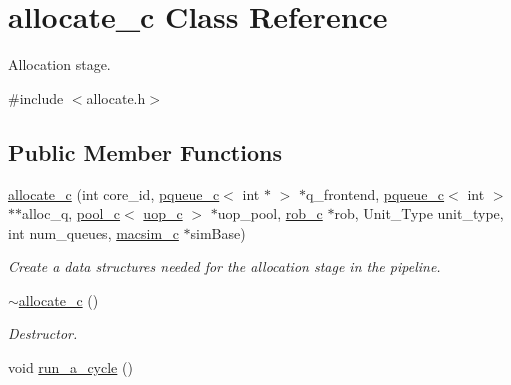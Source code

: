 \hypertarget{classallocate__c}{
\section{allocate\_\-c Class Reference}
\label{classallocate__c}
}


Allocation stage.  




{\ttfamily \#include $<$allocate.h$>$}

\subsection*{Public Member Functions}
\begin{DoxyCompactItemize}
\item 
\hyperlink{classallocate__c_aad0429c55ad2e9189f140647394896fb}{allocate\_\-c} (int core\_\-id, \hyperlink{classpqueue__c}{pqueue\_\-c}$<$ int $\ast$ $>$ $\ast$q\_\-frontend, \hyperlink{classpqueue__c}{pqueue\_\-c}$<$ int $>$ $\ast$$\ast$alloc\_\-q, \hyperlink{classpool__c}{pool\_\-c}$<$ \hyperlink{classuop__c}{uop\_\-c} $>$ $\ast$uop\_\-pool, \hyperlink{classrob__c}{rob\_\-c} $\ast$rob, Unit\_\-Type unit\_\-type, int num\_\-queues, \hyperlink{classmacsim__c}{macsim\_\-c} $\ast$simBase)
\begin{DoxyCompactList}\small\item\em Create a data structures needed for the allocation stage in the pipeline. \item\end{DoxyCompactList}\item 
\hyperlink{classallocate__c_a4c9c36de958b00180d586f7be7fdfed7}{$\sim$allocate\_\-c} ()
\begin{DoxyCompactList}\small\item\em Destructor. \item\end{DoxyCompactList}\item 
\hypertarget{classallocate__c_abd04c52f9cd71a29223d0131ad630332}{
void \hyperlink{classallocate__c_abd04c52f9cd71a29223d0131ad630332}{run\_\-a\_\-cycle} ()}
\label{classallocate__c_abd04c52f9cd71a29223d0131ad630332}


\end{DoxyCompactItemize}
